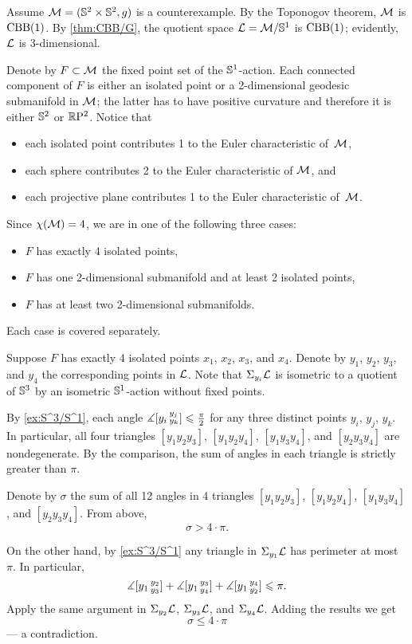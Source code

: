 Assume $\mathcal{M}=(\mathbb{S}^2\times\mathbb{S}^2,g)$ is a counterexample.
By the Toponogov theorem, $\mathcal{M}$ is $\mathrm{CBB}(1)$.
By \ref{thm:CBB/G}, the quotient space $\spc{L}\z=\spc{M}/\SSS^1$ is $\mathrm{CBB}(1)$;
evidently, $\mathcal{L}$ is 3-dimensional.

Denote by $F\subset \mathcal{M}$ the fixed point set of the $\mathbb{S}^1$-action.
Each connected component of $F$ is either an isolated point or a 2-dimensional geodesic submanifold in $\mathcal{M}$;
the latter has to have positive curvature and therefore it is either $\mathbb{S}^2$ or $\mathbb{R}\mathrm{P}^2$.
Notice that 
\begin{itemize}
 \item each isolated point contributes 1 to the Euler characteristic of~$\mathcal{M}$,
 \item each sphere contributes 2 to the Euler characteristic of $\mathcal{M}$, and
 \item each projective plane contributes 1 to the Euler characteristic of~$\mathcal{M}$.
\end{itemize}
Since $\chi(\mathcal{M})=4$, we are in one of the following three cases:
\begin{itemize}
 \item $F$ has exactly 4 isolated points,
 \item $F$ has one 2-dimensional submanifold and at least 2 isolated points,
 \item $F$ has at least two 2-dimensional submanifolds.
\end{itemize}
Each case is covered separately.

Suppose $F$ has exactly 4 isolated points $x_1$, $x_2$, $x_3$, and $x_4$.
Denote by $y_1$, $y_2$, $y_3$, and $y_4$ the corresponding points in $\mathcal{L}$.
Note that $\Sigma_{y_i}\mathcal{L}$ is isometric to a quotient of $\mathbb{S}^3$ by an isometric $\mathbb{S}^1$-action without fixed points.

By \ref{ex:S^3/S^1}, each angle $\measuredangle[y_i\,{}^{y_j}_{y_k}]\leqslant \tfrac\pi2$ for any three distinct points 
$y_i$, $y_j$, $y_k$.
In particular, all four triangles $[y_1y_2y_3]$, $[y_1y_2y_4]$, $[y_1y_3y_4]$, and $[y_2y_3y_4]$ are nondegenerate.
By the comparison, the sum of angles in each triangle is strictly greater than $\pi$.

Denote by $\sigma$ the sum of all 12 angles in 4 triangles $[y_1y_2y_3]$, $[y_1y_2y_4]$, $[y_1y_3y_4]$, and $[y_2y_3y_4]$.
From above,
\[\sigma>4\cdot\pi.\]

On the other hand, by \ref{ex:S^3/S^1} any triangle in $\Sigma_{y_1}\mathcal{L}$ has perimeter at most $\pi$.
In particular, 
\[\measuredangle[y_1\,{}^{y_2}_{y_3}]+\measuredangle[y_1\,{}^{y_3}_{y_4}]+\measuredangle[y_1\,{}^{y_4}_{y_2}]\leqslant \pi.\]
Apply the same argument in $\Sigma_{y_2}\mathcal{L}$, $\Sigma_{y_3}\mathcal{L}$, and $\Sigma_{y_4}\mathcal{L}$.
Adding the results we get 
\[\sigma\le 4\cdot\pi\]
--- a contradiction.

